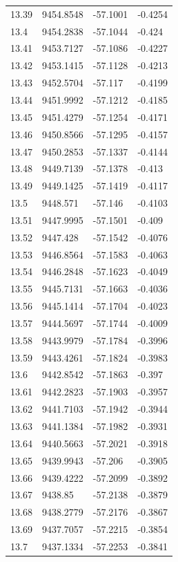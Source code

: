 \begin{table}[H]
\begin{tabular}{llll}
13.39 & 9454.8548 & -57.1001 & -0.4254 \\
13.4 & 9454.2838 & -57.1044 & -0.424 \\
13.41 & 9453.7127 & -57.1086 & -0.4227 \\
13.42 & 9453.1415 & -57.1128 & -0.4213 \\
13.43 & 9452.5704 & -57.117 & -0.4199 \\
13.44 & 9451.9992 & -57.1212 & -0.4185 \\
13.45 & 9451.4279 & -57.1254 & -0.4171 \\
13.46 & 9450.8566 & -57.1295 & -0.4157 \\
13.47 & 9450.2853 & -57.1337 & -0.4144 \\
13.48 & 9449.7139 & -57.1378 & -0.413 \\
13.49 & 9449.1425 & -57.1419 & -0.4117 \\
13.5 & 9448.571 & -57.146 & -0.4103 \\
13.51 & 9447.9995 & -57.1501 & -0.409 \\
13.52 & 9447.428 & -57.1542 & -0.4076 \\
13.53 & 9446.8564 & -57.1583 & -0.4063 \\
13.54 & 9446.2848 & -57.1623 & -0.4049 \\
13.55 & 9445.7131 & -57.1663 & -0.4036 \\
13.56 & 9445.1414 & -57.1704 & -0.4023 \\
13.57 & 9444.5697 & -57.1744 & -0.4009 \\
13.58 & 9443.9979 & -57.1784 & -0.3996 \\
13.59 & 9443.4261 & -57.1824 & -0.3983 \\
13.6 & 9442.8542 & -57.1863 & -0.397 \\
13.61 & 9442.2823 & -57.1903 & -0.3957 \\
13.62 & 9441.7103 & -57.1942 & -0.3944 \\
13.63 & 9441.1384 & -57.1982 & -0.3931 \\
13.64 & 9440.5663 & -57.2021 & -0.3918 \\
13.65 & 9439.9943 & -57.206 & -0.3905 \\
13.66 & 9439.4222 & -57.2099 & -0.3892 \\
13.67 & 9438.85 & -57.2138 & -0.3879 \\
13.68 & 9438.2779 & -57.2176 & -0.3867 \\
13.69 & 9437.7057 & -57.2215 & -0.3854 \\
13.7 & 9437.1334 & -57.2253 & -0.3841 \\

\end{tabular}
\end{table}
